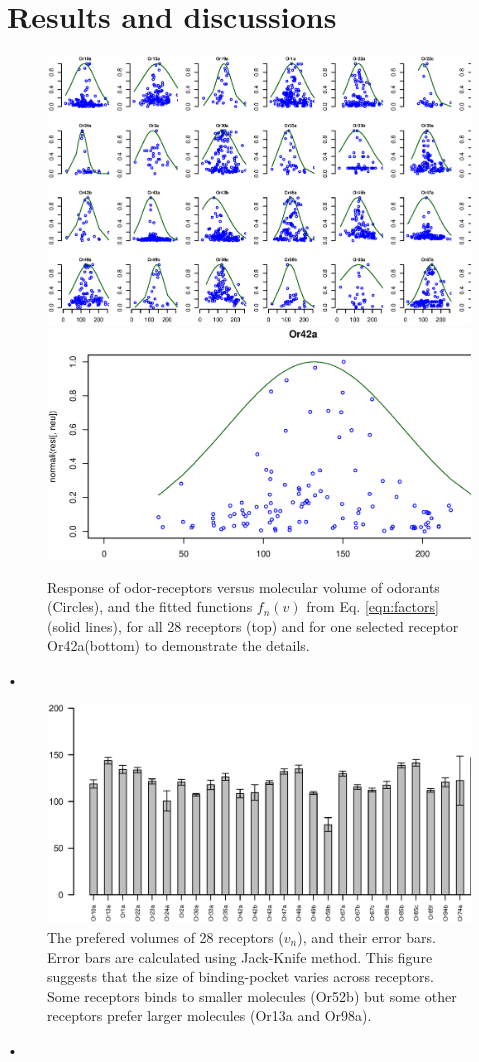 \documentclass[11pt]{paper} %
\begin{document}
\section{Results and discussions}
\begin{figure}
	\centering
	\includegraphics[width=\textwidth]{fig/vol-res}
	\includegraphics[width=0.75 \textwidth]{fig/vol-res-Or42a}
	\caption{Response of odor-receptors  versus molecular volume of odorants (Circles), and the fitted functions $f_n(v)$ from Eq. \ref{eqn:factors} (solid lines), 
	for all 28 receptors (top) and for one selected receptor Or42a(bottom) to demonstrate the details. }
	\label{fig:vol-res}
\end{figure}•
\begin{figure}
	\includegraphics[width=\textwidth]{fig/mean-vol}
	\caption{The prefered volumes of 28 receptors ($v_n$), and their error bars. Error bars are calculated using Jack-Knife method. 
	This figure suggests that the size of binding-pocket varies across receptors. 
	Some receptors binds to smaller molecules (Or52b) but some other receptors prefer larger molecules (Or13a and Or98a).}
	\label{fig:preferred_volume}
\end{figure}•
\end{document}
